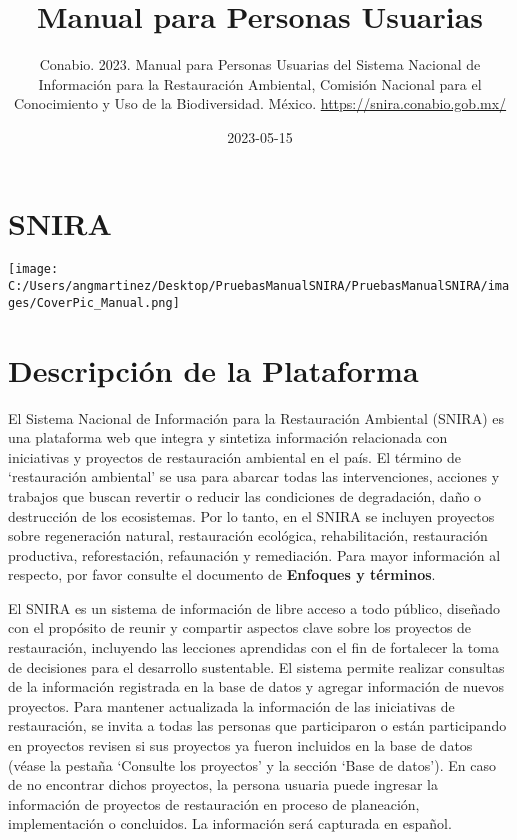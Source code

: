 \documentclass[
]{book}
\title{Manual para Personas Usuarias}
\author{Conabio. 2023. Manual para Personas Usuarias del Sistema Nacional de Información para la Restauración Ambiental, Comisión Nacional para el Conocimiento y Uso de la Biodiversidad. México. \url{https://snira.conabio.gob.mx/}}
\date{2023-05-15}
\begin{document}
\maketitle

{
\setcounter{tocdepth}{1}
\tableofcontents
}
\hypertarget{snira}{%
\chapter*{SNIRA}\label{snira}}

\texttt{[image: C:/Users/angmartinez/Desktop/PruebasManualSNIRA/PruebasManualSNIRA/images/CoverPic\_Manual.png]}

\hypertarget{descripciuxf3n-de-la-plataforma}{%
\chapter{Descripción de la Plataforma}\label{descripciuxf3n-de-la-plataforma}}

El Sistema Nacional de Información para la Restauración Ambiental (SNIRA) es una plataforma web que integra y sintetiza información relacionada con iniciativas y proyectos de restauración ambiental en el país. El término de `restauración ambiental' se usa para abarcar todas las intervenciones, acciones y trabajos que buscan revertir o reducir las condiciones de degradación, daño o destrucción de los ecosistemas. Por lo tanto, en el SNIRA se incluyen proyectos sobre regeneración natural, restauración ecológica, rehabilitación, restauración productiva, reforestación, refaunación y remediación. Para mayor información al respecto, por favor consulte el documento de \textbf{Enfoques y términos}.

El SNIRA es un sistema de información de libre acceso a todo público, diseñado con el propósito de reunir y compartir aspectos clave sobre los proyectos de restauración, incluyendo las lecciones aprendidas con el fin de fortalecer la toma de decisiones para el desarrollo sustentable. El sistema permite realizar consultas de la información registrada en la base de datos y agregar información de nuevos proyectos. Para mantener actualizada la información de las iniciativas de restauración, se invita a todas las personas que participaron o están participando en proyectos revisen si sus proyectos ya fueron incluidos en la base de datos (véase la pestaña `Consulte los proyectos' y la sección `Base de datos'). En caso de no encontrar dichos proyectos, la persona usuaria puede ingresar la información de proyectos de restauración en proceso de planeación, implementación o concluidos. La información será capturada en español.
\end{document}
